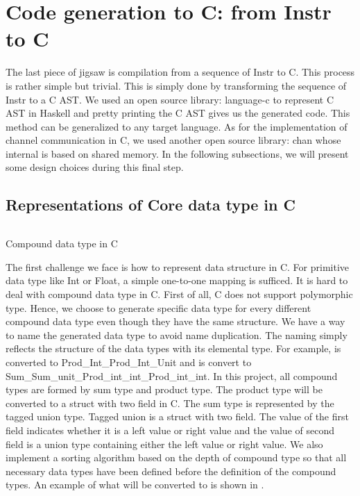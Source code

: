 \section{Code generation to C: from Instr to C}
The last piece of jigsaw is compilation from a sequence of Instr to C. This process is rather simple but trivial. This is simply done by transforming the sequence of Instr to a C AST. We used an open source library: language-c \cite{LanguagecAnalysisGeneration} to represent C AST in Haskell and pretty printing the C AST gives us the generated code. This method can be generalized to any target language. As for the implementation of channel communication in C, we used another open source library: chan \cite{treatPureImplementationGo2019} whose internal is based on shared memory. In the following subsections, we will present some design choices during this final step.
\subsection{Representations of Core data type in C}
\begin{listing}[ht]
    \inputminted{C}{codegen/data.c} 
    \caption{Compound data type in C}
    \label{codegen:code:data}
\end{listing}
The first challenge we face is how to represent data structure in C. For primitive data type like Int or Float, a simple one-to-one mapping is sufficed. It is hard to deal with compound data type in C. First of all, C does not support polymorphic type. Hence, we choose to generate specific data type for every different compound data type even though they have the same structure. We have a way to name the generated data type to avoid name duplication. The naming simply reflects the structure of the data types with its elemental type. For example,  is converted to Prod\_Int\_Prod\_Int\_Unit and  is convert to Sum\_Sum\_unit\_Prod\_int\_int\_Prod\_int\_int. In this project, all compound types are formed by sum type and product type. The product type will be converted to a struct with two field in C. The sum type is represented by the tagged union type. Tagged union is a struct with two field. The value of the first field indicates whether it is a left value or right value and the value of second field is a union type containing either the left value or right value. We also implement a sorting algorithm based on the depth of compound type so that all necessary data types have been defined before the definition of the compound types. An example of what  will be converted to is shown in .

